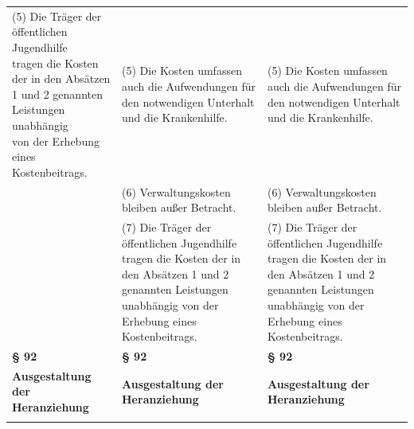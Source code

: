 \documentclass[10pt,a4paper,landscape]{article}
\begin{document}
\begin{longtable}{|L{8.2cm}|L{8.2cm}|L{8.2cm}|}
\hhline{|---|}
(5) Die \textcolor{diffred}{Träger der öffentlichen Jugendhilfe  \newline tragen} die \textcolor{diffred}{Kosten der in} den \textcolor{diffred}{Absätzen 1}  \newline und \textcolor{diffred}{2 genannten Leistungen unabhängig  \newline von der Erhebung eines Kostenbeitrags.} & (5) Die Kosten umfassen auch die  \newline Aufwendungen für den notwendigen  \newline Unterhalt und die Krankenhilfe. & (5) Die Kosten umfassen auch die  \newline Aufwendungen für den notwendigen  \newline Unterhalt und die Krankenhilfe. \\
\hhline{|---|}
 & (6) Verwaltungskosten bleiben außer  \newline Betracht. & (6) Verwaltungskosten bleiben außer  \newline Betracht. \\
\hhline{|---|}
 & (7) Die Träger der öffentlichen Jugendhilfe  \newline tragen die Kosten der in den Absätzen 1  \newline und 2 genannten Leistungen unabhängig  \newline von der Erhebung eines Kostenbeitrags. & (7) Die Träger der öffentlichen Jugendhilfe  \newline tragen die Kosten der in den Absätzen 1  \newline und 2 genannten Leistungen unabhängig  \newline von der Erhebung eines Kostenbeitrags. \\
\hhline{|---|}
\textbf{\S{} 92} & \textbf{\S{} 92} & \textbf{\S{} 92} \\
\hhline{|---|}
\textbf{Ausgestaltung der Heranziehung } & \textbf{Ausgestaltung der Heranziehung } & \textbf{Ausgestaltung der Heranziehung } \\
\hhline{|---|}

\end{longtable}
\end{document}
